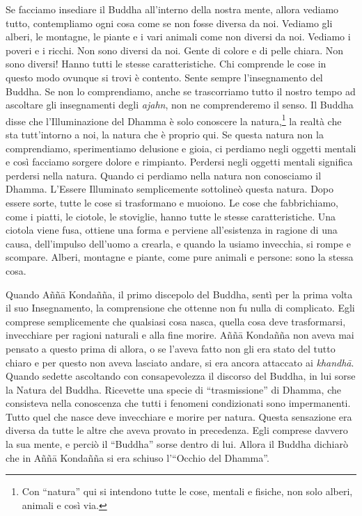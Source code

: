 Se facciamo insediare il Buddha all'interno della nostra mente, allora
vediamo tutto, contempliamo ogni cosa come se non fosse diversa da noi.
Vediamo gli alberi, le montagne, le piante e i vari animali come non
diversi da noi. Vediamo i poveri e i ricchi. Non sono diversi da noi.
Gente di colore e di pelle chiara. Non sono diversi! Hanno tutti le
stesse caratteristiche. Chi comprende le cose in questo modo ovunque si
trovi è contento. Sente sempre l'insegnamento del Buddha. Se non lo
comprendiamo, anche se trascorriamo tutto il nostro tempo ad ascoltare
gli insegnamenti degli \emph{ajahn}, non ne comprenderemo il senso. Il
Buddha disse che l'Illuminazione del Dhamma è solo conoscere la
natura,\footnote{Con ``natura'' qui si intendono tutte le cose, mentali
  e fisiche, non solo alberi, animali e così via.} la realtà che sta
tutt'intorno a noi, la natura che è proprio qui. Se questa natura non la
comprendiamo, sperimentiamo delusione e gioia, ci perdiamo negli oggetti
mentali e così facciamo sorgere dolore e rimpianto. Perdersi negli
oggetti mentali significa perdersi nella natura. Quando ci perdiamo
nella natura non conosciamo il Dhamma. L'Essere Illuminato semplicemente
sottolineò questa natura. Dopo essere sorte, tutte le cose si
trasformano e muoiono. Le cose che fabbrichiamo, come i piatti, le
ciotole, le stoviglie, hanno tutte le stesse caratteristiche. Una
ciotola viene fusa, ottiene una forma e perviene all'esistenza in
ragione di una causa, dell'impulso dell'uomo a crearla, e quando la
usiamo invecchia, si rompe e scompare. Alberi, montagne e piante, come
pure animali e persone: sono la stessa cosa.

Quando Aññā Kondañña, il primo discepolo del Buddha, sentì per la prima
volta il suo Insegnamento, la comprensione che ottenne non fu nulla di
complicato. Egli comprese semplicemente che qualsiasi cosa nasca, quella
cosa deve trasformarsi, invecchiare per ragioni naturali e alla fine
morire. Aññā Kondañña non aveva mai pensato a questo prima di allora, o
se l'aveva fatto non gli era stato del tutto chiaro e per questo non
aveva lasciato andare, si era ancora attaccato ai \emph{khandhā}. Quando
sedette ascoltando con consapevolezza il discorso del Buddha, in lui
sorse la Natura del Buddha. Ricevette una specie di ``trasmissione'' di
Dhamma, che consisteva nella conoscenza che tutti i fenomeni
condizionati sono impermanenti. Tutto quel che nasce deve invecchiare e
morire per natura. Questa sensazione era diversa da tutte le altre che
aveva provato in precedenza. Egli comprese davvero la sua mente, e
perciò il ``Buddha'' sorse dentro di lui. Allora il Buddha dichiarò che
in Aññā Kondañña si era schiuso l'``Occhio del Dhamma''.

